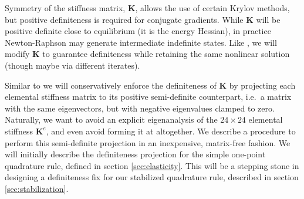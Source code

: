Symmetry of the stiffness matrix, $\mathbf{K}$, allows the use of certain Krylov
methods, but positive definiteness is required for conjugate gradients. While
$\mathbf{K}$ will be positive definite close to equilibrium (it is the energy
Hessian), in practice Newton-Raphson may generate intermediate
indefinite states. Like \cite{teran:2005:quasistatics}, we will modify
$\mathbf{K}$ to guarantee definiteness while retaining the same nonlinear
solution (though maybe via different iterates).



Similar to \cite{teran:2005:quasistatics} we will conservatively enforce the definiteness of $\mathbf{K}$ by projecting each elemental stiffness matrix to its positive semi-definite
counterpart, i.e.\ a matrix with the same eigenvectors, but with negative eigenvalues clamped to zero. Naturally, we want to avoid an explicit eigenanalysis of the $24\times 24$
elemental stiffness $\mathbf{K}^e$, and even avoid forming it at altogether. We describe a procedure to perform this semi-definite projection in an inexpensive, matrix-free fashion. We
will initially describe the definiteness projection for the simple one-point quadrature rule, defined in section \ref{sec:elasticity}. This will be a stepping stone in designing a
definiteness fix for our stabilized quadrature rule, described in
section \ref{sec:stabilization}. 

